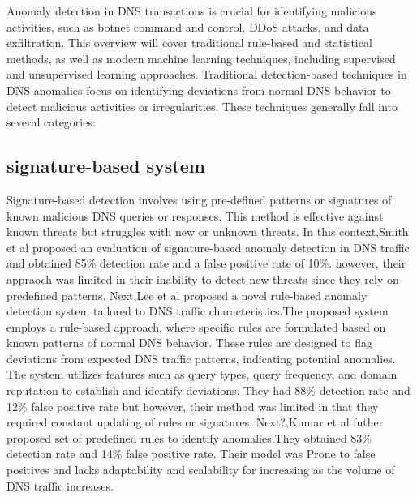 \label{chapEditionStructure}

Anomaly detection in DNS transactions is crucial for identifying malicious activities, such as botnet command and control, DDoS attacks, and data exfiltration. This overview will cover traditional rule-based and statistical methods, as well as modern machine learning techniques, including supervised and unsupervised learning approaches.
Traditional detection-based techniques in DNS anomalies focus on identifying deviations from normal DNS behavior to detect malicious activities or irregularities. These techniques generally fall into several categories:
\subsection{signature-based system}
Signature-based detection involves using pre-defined patterns or signatures of known malicious DNS queries or responses. This method is effective against known threats but struggles with new or unknown threats. In this context,Smith et al \cite{smith2019evaluation} proposed an evaluation of signature-based anomaly detection in DNS traffic and obtained 85\% detection rate and a false positive rate of 10\%. however, their appraoch was limited in their inability to detect new threats since they rely on predefined patterns. Next,Lee et al \cite{lee2020novel} proposed a novel rule-based anomaly detection system  tailored to DNS traffic characteristics.The proposed system employs a rule-based approach, where specific rules are formulated based on known patterns of normal DNS behavior. These rules are designed to flag deviations from expected DNS traffic patterns, indicating potential anomalies. The system utilizes features such as query types, query frequency, and domain reputation to establish and identify deviations. They had 88\% detection rate and 12\% false positive rate but however, their method was limited in that they required constant updating of rules or signatures. Next?,Kumar et al \cite{kumar2021dns} futher proposed set of predefined rules to identify anomalies.They obtained 83\% detection rate and 14\% false positive rate. Their model was Prone to false positives and lacks adaptability  and scalability for increasing as the volume of DNS traffic increases.



